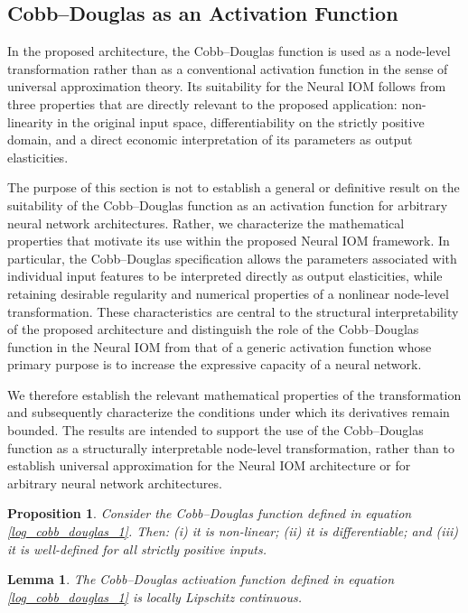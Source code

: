 \documentclass[preprint,12pt,authoryear]{sn-jnl}
\newtheorem{lemma}{Lemma}
\newtheorem{proposition}{Proposition}
\begin{document}
\subsection{Cobb--Douglas as an Activation Function}

In the proposed architecture, the Cobb--Douglas function is used as a node-level transformation rather than as a conventional activation function in the sense of universal approximation theory. Its suitability for the Neural IOM follows from three properties that are directly relevant to the proposed application: non-linearity in the original input space, differentiability on the strictly positive domain, and a direct economic interpretation of its parameters as output elasticities.

The purpose of this section is not to establish a general or definitive result on the suitability of the Cobb--Douglas function as an activation function for arbitrary neural network architectures. Rather, we characterize the mathematical properties that motivate its use within the proposed Neural IOM framework. In particular, the Cobb--Douglas specification allows the parameters associated with individual input features to be interpreted directly as output elasticities, while retaining desirable regularity and numerical properties of a nonlinear node-level transformation. These characteristics are central to the structural interpretability of the proposed architecture and distinguish the role of the Cobb--Douglas function in the Neural IOM from that of a generic activation function whose primary purpose is to increase the expressive capacity of a neural network.

We therefore establish the relevant mathematical properties of the transformation and subsequently characterize the conditions under which its derivatives remain bounded. The results are intended to support the use of the Cobb--Douglas function as a structurally interpretable node-level transformation, rather than to establish universal approximation for the Neural IOM architecture or for arbitrary neural network architectures.


\begin{proposition}\label{proposition_1}
Consider the Cobb--Douglas function defined in equation \ref{log_cobb_douglas_1}. Then: (i) it is non-linear; (ii) it is differentiable; and (iii) it is well-defined for all strictly positive inputs.
\end{proposition}

\begin{lemma} \label{lemma_continuity}
The Cobb--Douglas activation function defined in equation \ref{log_cobb_douglas_1} is locally Lipschitz continuous.
\end{lemma}
\end{document}
